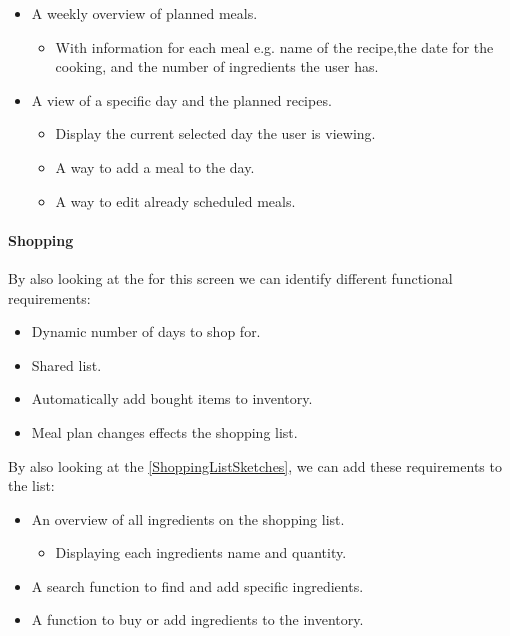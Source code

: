\begin{itemize}
	\item A weekly overview of planned meals.
		\begin{itemize}
			\item With information  for each meal e.g. name of the recipe,the date for the cooking, and the number of ingredients the user has.
		\end{itemize}
	\item A view of a specific day and the planned recipes.
		\begin{itemize}
			\item Display the current selected day the user is viewing.
			\item A way to add a meal to the day.
			\item A way to edit already scheduled meals.
		\end{itemize}  
\end{itemize} 

\paragraph{Shopping}
By also looking at the  for this screen we can identify different functional requirements:

\begin{itemize}
	\item Dynamic number of days to shop for.
	\item Shared list.
	\item Automatically add bought items to inventory.
	\item Meal plan changes effects the shopping list.
\end{itemize} 

By also looking at the  \cref{ShoppingListSketches}, we can add these requirements to the list:

\begin{itemize}
	\item An overview of all ingredients on the shopping list.
		\begin{itemize}
			\item Displaying each ingredients name and quantity.
		\end{itemize}		 
	\item A search function to find and add specific ingredients.
	\item A function to buy or add ingredients to the inventory.	
\end{itemize}

